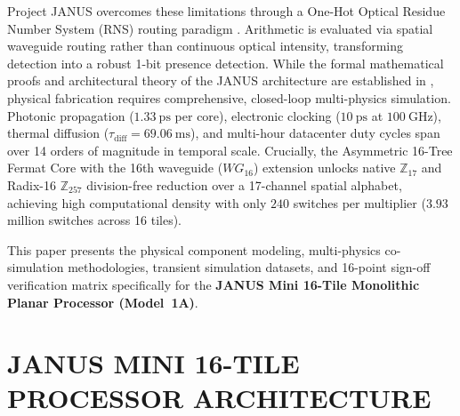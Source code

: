 \documentclass[journal]{IEEEtran}
\begin{document}
Project JANUS overcomes these limitations through a One-Hot Optical Residue Number System (RNS) routing paradigm \cite{Bhardwaj2026JANUS}\cite{Huang1979}\cite{Omosanya2021}. Arithmetic is evaluated via spatial waveguide routing rather than continuous optical intensity, transforming detection into a robust 1-bit presence detection. While the formal mathematical proofs and architectural theory of the JANUS architecture are established in \cite{Bhardwaj2026JANUS}, physical fabrication requires comprehensive, closed-loop multi-physics simulation. Photonic propagation ($1.33~\mathrm{ps}$ per core), electronic clocking ($10~\mathrm{ps}$ at $100~\mathrm{GHz}$), thermal diffusion ($\tau_{\mathrm{diff}} = 69.06~\mathrm{ms}$), and multi-hour datacenter duty cycles span over 14 orders of magnitude in temporal scale. Crucially, the Asymmetric 16-Tree Fermat Core with the 16th waveguide ($WG_{16}$) extension unlocks native $\mathbb{Z}_{17}$ and Radix-16 $\mathbb{Z}_{257}$ division-free reduction over a 17-channel spatial alphabet, achieving high computational density with only $240$ switches per multiplier ($3.93$ million switches across 16 tiles).

This paper presents the physical component modeling, multi-physics co-simulation methodologies, transient simulation datasets, and 16-point sign-off verification matrix specifically for the \textbf{JANUS Mini 16-Tile Monolithic Planar Processor (Model~1A)}.

\section{JANUS MINI 16-TILE PROCESSOR ARCHITECTURE}
\end{document}
